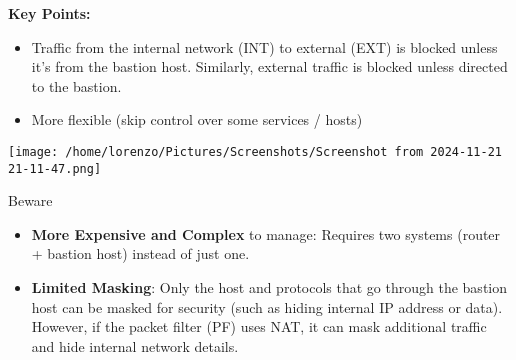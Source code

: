 \begin{minipage}{0.5\textwidth}
	\vspace{-1.5cm}
    \textbf{Key Points:}
    \begin{itemize}
        \item Traffic from the internal network (INT) to external (EXT) is blocked unless it’s from the bastion host. Similarly, external traffic is blocked unless directed to the bastion.
        \item More flexible (skip control over some services / hosts)
    \end{itemize}
\end{minipage} 
\hfill
\begin{minipage}{0.5\textwidth}
    \centering
    \texttt{[image: 
        /home/lorenzo/Pictures/Screenshots/Screenshot from 2024-11-21 21-11-47.png]}
\end{minipage}
\begin{center}
    \begin{quotebox-red}{Beware}
        \begin{itemize}
            \item \textbf{More Expensive and Complex} 
       to manage: Requires two systems (router + bastion host) instead of just one.
       \item \textbf{Limited Masking}: Only the host and protocols that go through the bastion host can be masked for security (such as hiding internal IP address or data). However, if the packet filter (PF) uses NAT, it can mask additional traffic and hide internal network details.
     \end{itemize}
    \end{quotebox-red}   
\end{center}








